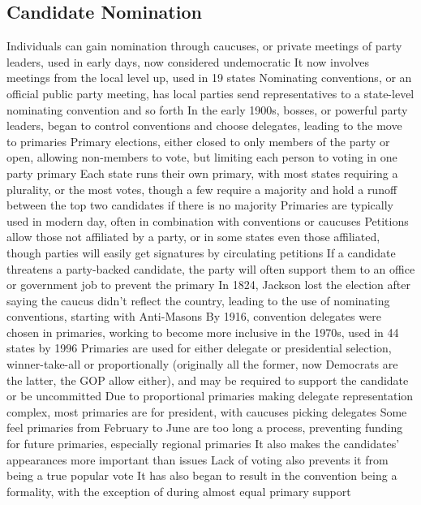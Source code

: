 \documentclass[11 pt, twoside]{article}
\newenvironment{outline*}
{
	\begin{outline}[enumerate]
	}
	{\end{outline}
}
\begin{document}
\subsection{Candidate Nomination}
\begin{outline*}
\1 Individuals can gain nomination through caucuses, or private meetings of party leaders, used in early days, now considered undemocratic
\2 It now involves meetings from the local level up, used in 19 states
\1 Nominating conventions, or an official public party meeting, has local parties send representatives to a state-level nominating convention and so forth
\2 In the early 1900s, bosses, or powerful party leaders, began to control conventions and choose delegates, leading to the move to primaries
\1 Primary elections, either closed to only members of the party or open, allowing non-members to vote, but limiting each person to voting in one party primary
\2 Each state runs their own primary, with most states requiring a plurality, or the most votes, though a few require a majority and hold a runoff between the top two candidates if there is no majority
\2 Primaries are typically used in modern day, often in combination with conventions or caucuses
\1 Petitions allow those not affiliated by a party, or in some states even those affiliated, though parties will easily get signatures by circulating petitions
\2 If a candidate threatens a party-backed candidate, the party will often support them to an office or government job to prevent the primary
\1 In 1824, Jackson lost the election after saying the caucus didn’t reflect the country, leading to the use of nominating conventions, starting with Anti-Masons
\2 By 1916, convention delegates were chosen in primaries, working to become more inclusive in the 1970s, used in 44 states by 1996
\1 Primaries are used for either delegate or presidential selection, winner-take-all or proportionally (originally all the former, now Democrats are the latter, the GOP allow either), and may be required to support the candidate or be uncommitted
\2 Due to proportional primaries making delegate representation complex, most primaries are for president, with caucuses picking delegates
\2 Some feel primaries from February to June are too long a process, preventing funding for future primaries, especially regional primaries
\2 It also makes the candidates’ appearances more important than issues
\2 Lack of voting also prevents it from being a true popular vote
\2 It has also began to result in the convention being a formality, with the exception of during almost equal primary support

\end{outline*}
\end{document}
